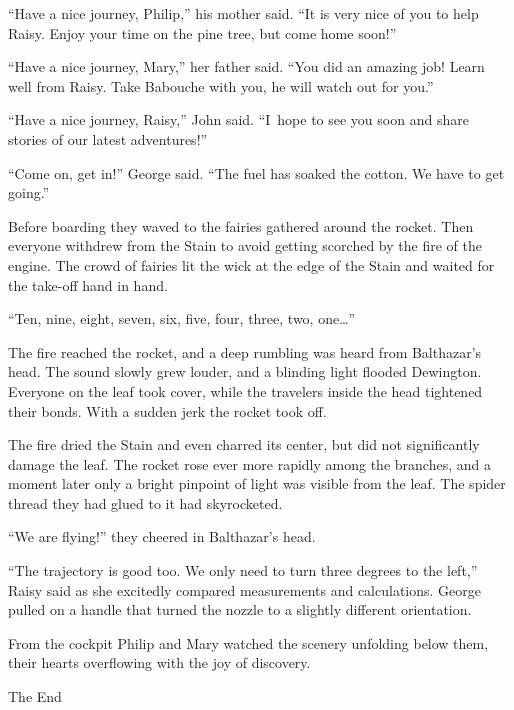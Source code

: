 \documentclass[10pt]{memoir}
\begin{document}
``Have a nice journey, Philip,'' his mother said. ``It is very nice of you to
help Raisy. Enjoy your time on the pine tree, but come home soon!''

``Have a nice journey, Mary,'' her father said. ``You did an amazing job! Learn
well from Raisy. Take Babouche with you, he will watch out for you.''

``Have a nice journey, Raisy,'' John said. ``I~hope to see you soon and share
stories of our latest adventures!''

``Come on, get in!'' George said. ``The fuel has soaked the cotton. We have to
get going.''

Before boarding they waved to the fairies gathered around the rocket. Then
everyone withdrew from the Stain to avoid getting scorched by the fire of the
engine. The crowd of fairies lit the wick at the edge of the Stain and waited
for the take-off hand in hand.

``Ten, nine, eight, seven, six, five, four, three, two, one\dots''

The fire reached the rocket, and a deep rumbling was heard from Balthazar's
head. The sound slowly grew louder, and a blinding light flooded Dewington.
Everyone on the leaf took cover, while the travelers inside the head tightened
their bonds. With a sudden jerk the rocket took off.

The fire dried the Stain and even charred its center, but did not significantly
damage the leaf. The rocket rose ever more rapidly among the branches, and a
moment later only a bright pinpoint of light was visible from the leaf. The
spider thread they had glued to it had skyrocketed.

``We are flying!'' they cheered in Balthazar's head.

``The trajectory is good too. We only need to turn three degrees to the left,''
Raisy said as she excitedly compared measurements and calculations. George
pulled on a handle that turned the nozzle to a slightly different orientation.

From the cockpit Philip and Mary watched the scenery unfolding below them,
their hearts overflowing with the joy of discovery.

\begin{center}
The End
\end{center}
\end{document}
